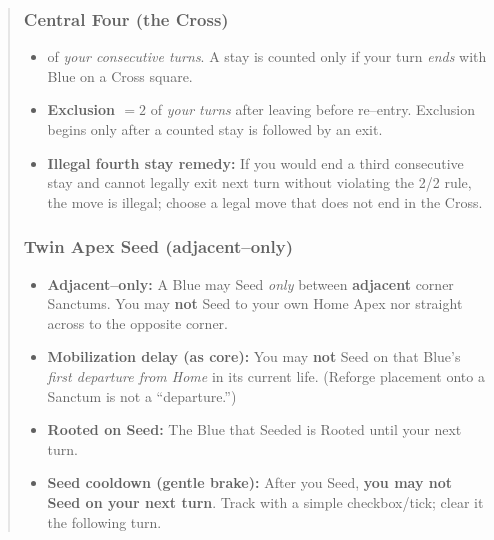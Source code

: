 \documentclass[11pt]{article}
\begin{document}
\begin{quote}
\subsubsection*{Central Four (the Cross)}
\begin{itemize}[leftmargin=1.3em,itemsep=0.2em]
  \item {} of \emph{your consecutive turns}. A stay is counted only if your turn \emph{ends} with Blue on a Cross square.
  \item \textbf{Exclusion $=2$} of \emph{your turns} after leaving before re--entry. Exclusion begins only after a counted stay is followed by an exit.
  \item \textbf{Illegal fourth stay remedy:} If you would end a third consecutive stay and cannot legally exit next turn without violating the 2/2 rule, the move is illegal; choose a legal move that does not end in the Cross.
\end{itemize}

\subsubsection*{Twin Apex Seed (adjacent--only)}
\begin{itemize}[leftmargin=1.3em,itemsep=0.25em]
  \item \textbf{Adjacent--only:} A Blue may Seed \emph{only} between \textbf{adjacent} corner Sanctums. You may \textbf{not} Seed to your own Home Apex nor straight across to the opposite corner.
  \item \textbf{Mobilization delay (as core):} You may \textbf{not} Seed on that Blue's \emph{first departure from Home} in its current life. (Reforge placement onto a Sanctum is not a ``departure.'')
  \item \textbf{Rooted on Seed:} The Blue that Seeded is Rooted until your next turn.
  \item \textbf{Seed cooldown (gentle brake):} After you Seed, \textbf{you may not Seed on your next turn}. Track with a simple checkbox/tick; clear it the following turn.
\end{itemize}


\end{quote}
\end{document}
